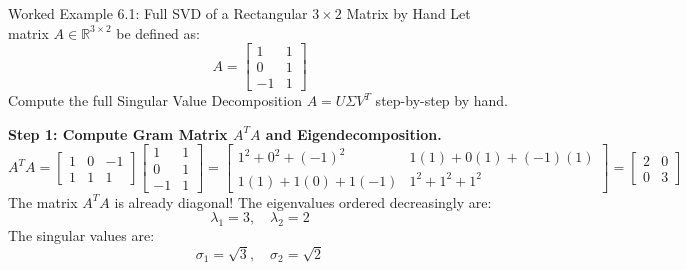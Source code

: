 \begin{examplebox}[breakable]{Worked Example 6.1: Full SVD of a Rectangular $3 \times 2$ Matrix by Hand}
Let matrix $A \in \mathbb{R}^{3 \times 2}$ be defined as:
\begin{equation}
A = \begin{bmatrix} 1 & 1 \\ 0 & 1 \\ -1 & 1 \end{bmatrix}
\end{equation}
Compute the full Singular Value Decomposition $A = U \Sigma V^T$ step-by-step by hand.

\textbf{Step 1: Compute Gram Matrix $A^T A$ and Eigendecomposition.}
\begin{equation}
A^T A = \begin{bmatrix} 1 & 0 & -1 \\ 1 & 1 & 1 \end{bmatrix} \begin{bmatrix} 1 & 1 \\ 0 & 1 \\ -1 & 1 \end{bmatrix} = \begin{bmatrix} 1^2 + 0^2 + (-1)^2 & 1(1) + 0(1) + (-1)(1) \\ 1(1) + 1(0) + 1(-1) & 1^2 + 1^2 + 1^2 \end{bmatrix} = \begin{bmatrix} 2 & 0 \\ 0 & 3 \end{bmatrix}
\end{equation}
The matrix $A^T A$ is already diagonal!
The eigenvalues ordered decreasingly are:
\begin{equation}
\lambda_1 = 3, \quad \lambda_2 = 2
\end{equation}
The singular values are:
\begin{equation}
\sigma_1 = \sqrt{3}, \quad \sigma_2 = \sqrt{2}
\end{equation}


\end{examplebox}
